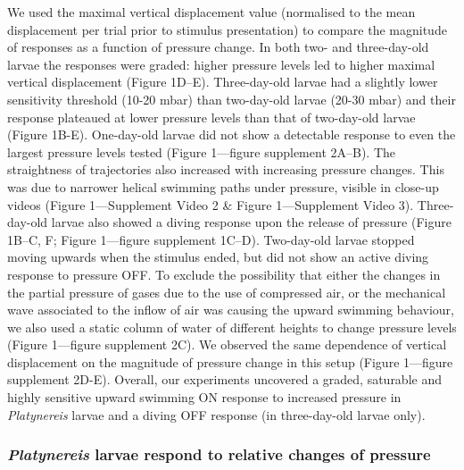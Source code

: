 \documentclass[
]{article}
\begin{document}
We used the maximal vertical displacement value (normalised to the mean
displacement per trial prior to stimulus presentation) to compare the
magnitude of responses as a function of pressure change. In both two-
and three-day-old larvae the responses were graded: higher pressure
levels led to higher maximal vertical displacement (Figure 1D--E).
Three-day-old larvae had a slightly lower sensitivity threshold (10-20
mbar) than two-day-old larvae (20-30 mbar) and their response plateaued
at lower pressure levels than that of two-day-old larvae (Figure 1B-E).
One-day-old larvae did not show a detectable response to even the
largest pressure levels tested (Figure 1---figure supplement 2A--B). The
straightness of trajectories also increased with increasing pressure
changes. This was due to narrower helical swimming paths under pressure,
visible in close-up videos (Figure 1---Supplement Video 2 \& Figure
1---Supplement Video 3). Three-day-old larvae also showed a diving
response upon the release of pressure (Figure 1B--C, F; Figure
1---figure supplement 1C--D). Two-day-old larvae stopped moving upwards
when the stimulus ended, but did not show an active diving response to
pressure OFF. To exclude the possibility that either the changes in the
partial pressure of gases due to the use of compressed air, or the
mechanical wave associated to the inflow of air was causing the upward
swimming behaviour, we also used a static column of water of different
heights to change pressure levels (Figure 1---figure supplement 2C). We
observed the same dependence of vertical displacement on the magnitude
of pressure change in this setup (Figure 1---figure supplement 2D-E).
Overall, our experiments uncovered a graded, saturable and highly
sensitive upward swimming ON response to increased pressure in
\emph{Platynereis} larvae and a diving OFF response (in three-day-old
larvae only).

\hypertarget{platynereis-larvae-respond-to-relative-changes-of-pressure}{%
\subsubsection{\texorpdfstring{\emph{Platynereis} larvae respond to
relative changes of
pressure}{Platynereis larvae respond to relative changes of pressure}}\label{platynereis-larvae-respond-to-relative-changes-of-pressure}}
\end{document}
